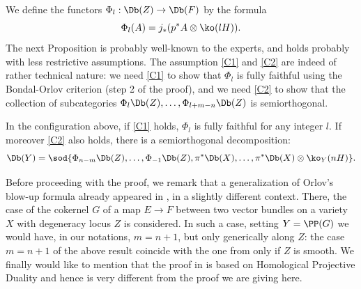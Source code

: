 We define the functors $\Phi_l:\Db(Z) \to \Db(F)$ by the formula
\[
\Phi_l(A)= j_* (p^* A \otimes \ko(lH)).
\]
The next Proposition is probably well-known to the experts, and holds probably with less
restrictive assumptions. The assumption \eqref{C1} and \eqref{C2} are indeed of rather technical nature:
we need \eqref{C1} to show that $\Phi_l$ is fully faithful using the Bondal-Orlov
criterion (step 2 of the proof), and we need \eqref{C2} to show that the collection of subcategories
$\Phi_l \Db(Z),\ldots,\Phi_{l+m-n}\Db(Z)$ is semiorthogonal.\enlargethispage{\baselineskip}%

\begin{prop}\label{prop:main-sod}
In the configuration above, if \eqref{C1} holds, $\Phi_l$ is fully faithful for any integer $l$.
If moreover \eqref{C2} also holds, there is a semiorthogonal decomposition:
\[
\Db(Y)=\sod{\Phi_{n-m}\Db(Z),\ldots,\Phi_{-1}\Db(Z),\pi^*\Db(X),\ldots,\pi^*\Db(X)\otimes \ko_Y(nH)}.
\]
\end{prop}

Before proceeding with the proof, we remark that a generalization of Orlov's
blow-up formula already appeared in \cite{Jiang-Leung}, in a slightly different context. There, the
case of the cokernel $G$ of a map $E \to F$ between two vector bundles on a variety $X$ with degeneracy locus $Z$
is considered. In such a case, setting $Y=\PP(G)$ we would have, in our notations, $m=n+1$, but only generically
along $Z$: the case $m=n+1$ of the above result coincide with the one from \cite{Jiang-Leung}
only if $Z$ is smooth. We finally would like to mention that the proof in \cite{Jiang-Leung} is based
on Homological Projective Duality and hence is very different from the proof we are giving here.

